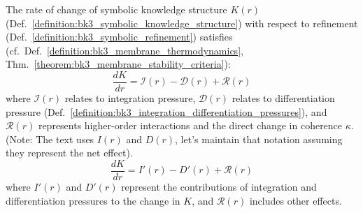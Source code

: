 \begin{theorem} \label{theorem:bk3_evolution_of_symbolic_knowledge}
The rate of change of symbolic knowledge structure $K(r)$ (Def.~\ref{definition:bk3_symbolic_knowledge_structure}) with respect to refinement (Def.~\ref{definition:bk3_symbolic_refinement}) satisfies (cf.~Def.~\ref{definition:bk3_membrane_thermodynamics}, Thm.~\ref{theorem:bk3_membrane_stability_criteria}):
\[
\frac{dK}{dr} = \mathcal{I}(r) - \mathcal{D}(r) + \mathcal{R}(r)
\]
where $\mathcal{I}(r)$ relates to integration pressure, $\mathcal{D}(r)$ relates to differentiation pressure (Def.~\ref{definition:bk3_integration_differentiation_pressures}), and $\mathcal{R}(r)$ represents higher-order interactions and the direct change in coherence $\kappa$. (Note: The text uses $I(r)$ and $D(r)$, let's maintain that notation assuming they represent the net effect).
\[
\frac{dK}{dr} = I'(r) - D'(r) + \mathcal{R}(r)
\]
where $I'(r)$ and $D'(r)$ represent the contributions of integration and differentiation pressures to the change in $K$, and $\mathcal{R}(r)$ includes other effects.
\end{theorem}

